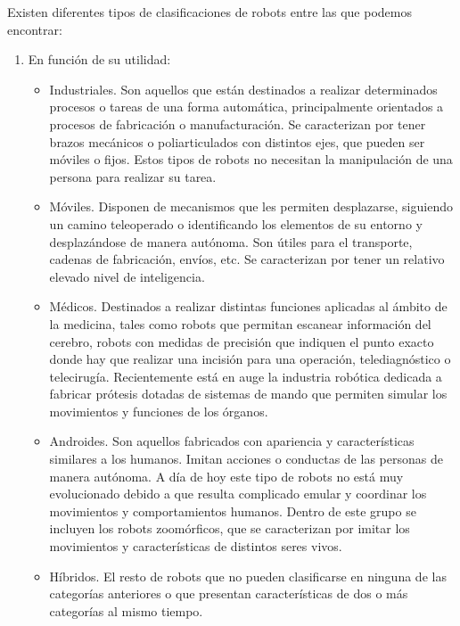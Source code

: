 \documentclass{report}
\begin{document}
Existen diferentes tipos de clasificaciones de robots \cite{Usategui} entre las que podemos encontrar:

\begin{enumerate}
	\item En función de su utilidad:
	\begin{itemize}
		\item Industriales. Son aquellos que están destinados a realizar determinados procesos o tareas de una forma automática, principalmente orientados a procesos de fabricación o manufacturación. Se caracterizan por tener brazos mecánicos o poliarticulados con distintos ejes, que pueden ser móviles o fijos. Estos tipos de robots no necesitan la manipulación de una persona para realizar su tarea.
		
		\item Móviles. Disponen de mecanismos que les permiten desplazarse, siguiendo un camino teleoperado o identificando los elementos de su entorno y desplazándose de manera autónoma. Son útiles para el transporte, cadenas de fabricación, envíos, etc. Se caracterizan por tener un relativo elevado nivel de inteligencia.
		
		\item Médicos. Destinados a realizar distintas funciones aplicadas al ámbito de la medicina, tales como robots que permitan escanear información del cerebro, robots con medidas de precisión que indiquen el punto exacto donde hay que realizar una incisión para una operación, telediagnóstico o telecirugía. Recientemente está en auge la industria robótica dedicada a fabricar prótesis dotadas de sistemas de mando que permiten simular los movimientos y funciones de los órganos.
		
		\item Androides. Son aquellos fabricados con apariencia y características similares a los humanos. Imitan acciones o conductas de las personas de manera autónoma. A día de hoy este tipo de robots no está muy evolucionado debido a que resulta complicado emular y coordinar los movimientos y comportamientos humanos. Dentro de este grupo se incluyen los robots zoomórficos, que se caracterizan por imitar los movimientos y características de distintos seres vivos.
		 
		\item Híbridos. El resto de robots que no pueden clasificarse en ninguna de las categorías anteriores o que presentan características de dos o más categorías al mismo tiempo.


\end{itemize}
\end{enumerate}
\end{document}
